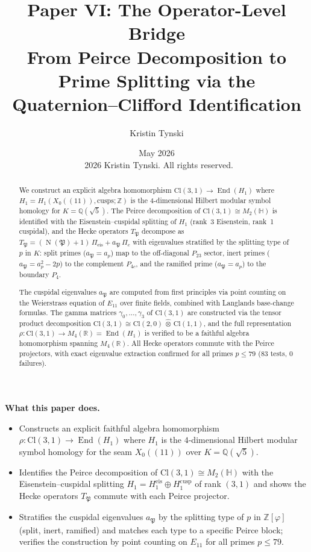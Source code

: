 \documentclass[11pt,a4paper]{article}
\title{Paper VI: The Operator-Level Bridge\\[4pt]
\large From Peirce Decomposition to Prime Splitting via the Quaternion--Clifford Identification}
\author{Kristin Tynski}
\date{May 2026 \\[6pt] {\small\textcopyright\ 2026 Kristin Tynski. All rights reserved.}}
\theoremstyle{plain}
\theoremstyle{definition}
\theoremstyle{remark}
\numberwithin{equation}{section}
\providecommand{\Cl}{\mathrm{Cl}}
\providecommand{\Z}{\mathbb{Z}}
\providecommand{\Q}{\mathbb{Q}}
\providecommand{\HH}{\mathbb{H}}
\providecommand{\ZZ}{\mathbb{Z}}
\providecommand{\QQ}{\mathbb{Q}}
\providecommand{\RR}{\mathbb{R}}
\providecommand{\vp}{\varphi}
\providecommand{\fP}{\mathfrak{P}}
\DeclareMathOperator{\End}{End}
\DeclareMathOperator{\Nm}{N}
\begin{document}
\maketitle

\begin{abstract}
We construct an explicit algebra homomorphism $\Cl(3,1) \to \End(H_1)$
where $H_1 = H_1(X_0((11)), \mathrm{cusps}; \ZZ)$ is the 4-dimensional
Hilbert modular symbol homology for $K = \QQ(\sqrt{5})$.  The Peirce
decomposition of $\Cl(3,1) \cong M_2(\HH)$ is identified with the
Eisenstein--cuspidal splitting of $H_1$ (rank~3 Eisenstein, rank~1 cuspidal),
and the Hecke operators $T_\fP$ decompose as $T_\fP = (\Nm(\fP)+1)\,\Pi_{\mathrm{eis}} + a_\fP\,\Pi_c$ with eigenvalues stratified by the splitting type of $p$ in $K$: split primes ($a_\fP = a_p$) map to the off-diagonal $P_{23}$ sector, inert primes ($a_\fP = a_p^2 - 2p$) to the complement $P_{4c}$, and the ramified prime ($a_\fP = a_p$) to the boundary $P_4$.

The cuspidal eigenvalues $a_\fP$ are computed from first principles via
point counting on the Weierstrass equation of $E_{11}$ over finite fields,
combined with Langlands base-change formulas.  The gamma matrices
$\gamma_0,\ldots,\gamma_3$ of $\Cl(3,1)$ are constructed via the tensor
product decomposition $\Cl(3,1) \cong \Cl(2,0)\,\hat\otimes\,\Cl(1,1)$,
and the full representation $\rho: \Cl(3,1) \to M_4(\RR) = \End(H_1)$ is
verified to be a faithful algebra homomorphism spanning $M_4(\RR)$.  All
Hecke operators commute with the Peirce projectors, with exact eigenvalue
extraction confirmed for all primes $p \leq 79$ (83 tests, 0 failures).
\end{abstract}

\medskip
\noindent\textbf{What this paper does.}
\begin{itemize}[leftmargin=1.5em,nosep,topsep=2pt]
  \item Constructs an explicit faithful algebra homomorphism
        $\rho: \Cl(3,1) \to \End(H_{1})$ where $H_{1}$ is the
        $4$-dimensional Hilbert modular symbol homology for
        the seam $X_{0}((11))$ over $K = \Q(\sqrt 5)$.
  \item Identifies the Peirce decomposition of
        $\Cl(3,1) \cong M_{2}(\HH)$ with the
        Eisenstein--cuspidal splitting
        $H_{1} = H_{1}^{\mathrm{eis}} \oplus H_{1}^{\mathrm{cusp}}$
        of rank $(3,1)$ and shows the Hecke operators
        $T_\fP$ commute with each Peirce projector.
  \item Stratifies the cuspidal eigenvalues $a_\fP$ by the
        splitting type of $p$ in $\Z[\vp]$ (split, inert, ramified)
        and matches each type to a specific Peirce block; verifies
        the construction by point counting on $E_{11}$ for all
        primes $p \le 79$.
\end{itemize}
\end{document}
